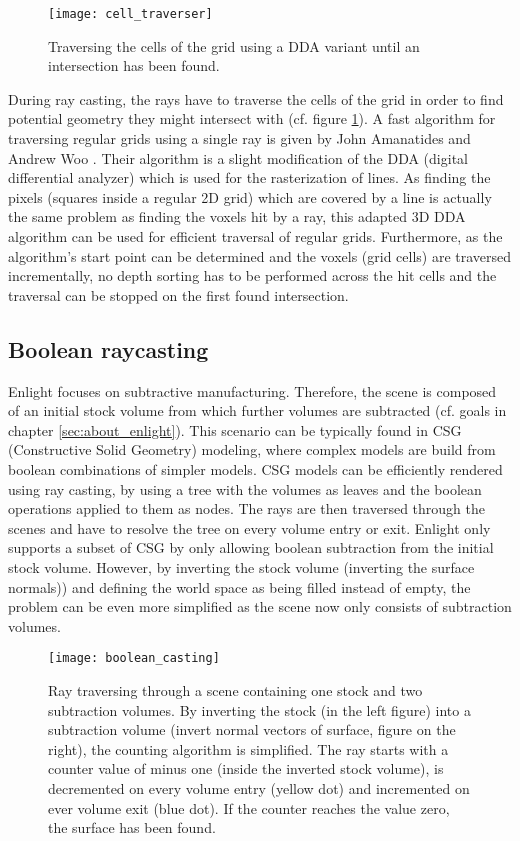 \begin{figure}
\centering
\texttt{[image: cell\_traverser]}
\caption{Traversing the cells of the grid using a DDA variant until an intersection has been found.}
\label{fig:cell_traverser}
\end{figure}

During ray casting, the rays have to traverse the cells of the grid in order to find potential geometry they might intersect with (cf. figure \ref{fig:cell_traverser}). A fast algorithm for traversing regular grids using a single ray is given by John Amanatides and Andrew Woo \cite{3DDDA}. Their algorithm is a slight modification of the DDA (digital differential analyzer) which is used for the rasterization of lines. As finding the pixels (squares inside a regular 2D grid) which are covered by a line is actually the same problem as finding the voxels hit by a ray, this adapted 3D DDA algorithm can be used for efficient traversal of regular grids. Furthermore, as the algorithm's start point can be determined and the voxels (grid cells) are traversed incrementally, no depth sorting has to be performed across the hit cells and the traversal can be stopped on the first found intersection.


\subsection{Boolean raycasting}

Enlight focuses on subtractive manufacturing. Therefore, the scene is composed of an initial stock volume from which further volumes are subtracted (cf. goals in chapter \ref{sec:about_enlight}). This scenario can be typically found in CSG (Constructive Solid Geometry) modeling, where complex models are build from boolean combinations of simpler models. CSG models can be efficiently rendered using ray casting, by using a tree with the volumes as leaves and the boolean operations applied to them as nodes. The rays are then traversed through the scenes and have to resolve the tree on every volume entry or exit. Enlight only supports a subset of CSG by only allowing boolean subtraction from the initial stock volume. However, by inverting the stock volume (inverting the surface normals)) and defining the world space as being filled instead of empty, the problem can be even more simplified as the scene now only consists of subtraction volumes.

\begin{figure}
\centering
\texttt{[image: boolean\_casting]}
\caption{Ray traversing through a scene containing one stock and two subtraction volumes. By inverting the stock (in the left figure) into a subtraction volume (invert normal vectors of surface, figure on the right), the counting algorithm is simplified. The ray starts with a counter value of minus one (inside the inverted stock volume), is decremented on every volume entry (yellow dot) and incremented on ever volume exit (blue dot). If the counter reaches the value zero, the surface has been found.}
\label{fig:boolean_casting} 
\end{figure}

